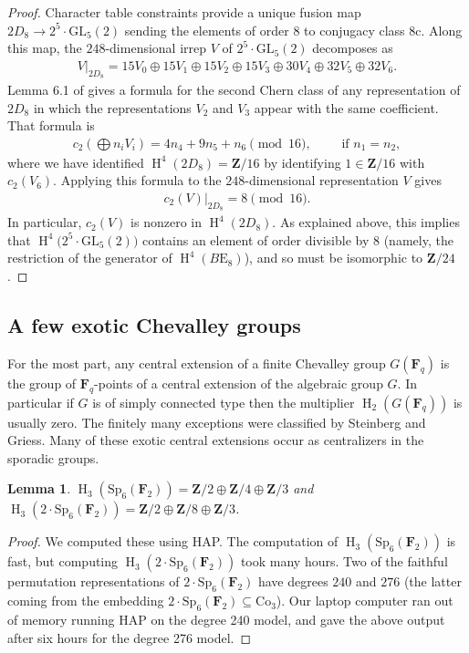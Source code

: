 \documentclass[pdftex]{sigma}
\numberwithin{equation}{section}
\newtheorem{Lemma}[Theorem]{Lemma}
\newcommand\bF{\mathbf F}
\newcommand\bZ{\mathbf Z}
\newcommand\rc{\mathrm c}
\newcommand\rE{\mathrm E}
\DeclareMathOperator\homology{H}
\renewcommand\H{\homology}
\newcommand\<\langle
\renewcommand\>\rangle
\newcommand\Co{\mathrm{Co}}
\newcommand{\GL}{\mathrm{GL}}
\newcommand{\Sp}{\mathrm{Sp}}
\begin{document}
\begin{proof}
Character table constraints provide a unique fusion map $2D_8 \to 2^5\cdot \GL_5(2)$ sending the elements of order $8$ to conjugacy class $8\rc$. Along this map, the $248$-dimensional irrep $V$ of $2^5\cdot \GL_5(2)$ decomposes as
\begin{gather*} V|_{2D_8} = 15 V_0 \oplus 15 V_1 \oplus 15 V_2 \oplus 15 V_3 \oplus 30 V_4 \oplus 32 V_5 \oplus 32 V_6. \end{gather*}
Lemma 6.1 of \cite{jft} gives a formula for the second Chern class of any representation of $2D_8$ in which the representations
$V_2$ and $V_3$
 appear with the same coefficient. That formula is
\begin{gather*} c_2\left(\bigoplus n_i V_i\right) = 4n_4 + 9n_5 + n_6 \pmod {16}, \qquad \text{ if } n_1 = n_2,\end{gather*}
where we have identified $\H^4(2D_8) = \bZ/16$ by identifying $1 \in \bZ/16$ with $c_2(V_6)$. Applying this formula to the $248$-dimensional representation $V$ gives
\begin{gather*} c_2(V)|_{2D_8} = 8 \pmod {16}.\end{gather*}
In particular, $c_2(V)$ is nonzero in $\H^4(2D_8)$. As explained above, this implies that $\H^4\big(2^5\cdot \GL_5(2)\big)$ contains an element of order divisible by $8$ (namely, the restriction of the generator of $\H^4(B\rE_8)$), and so must be isomorphic to $\bZ/24$.
\end{proof}

\subsection{A few exotic Chevalley groups}

For the most part, any central extension of a finite Chevalley group $G(\bF_q)$ is the group of $\bF_q$-points of a central extension of the algebraic group $G$.
 In particular if $G$ is of simply connected type then the multiplier $\H_2(G(\bF_q))$ is usually zero. The finitely many exceptions were classified by Steinberg and Griess. Many of these exotic central extensions occur as centralizers in the sporadic groups.

 \begin{Lemma} \label{lemma:Sp6}$\H_3(\Sp_6(\bF_2)) = \bZ/2 \oplus \bZ/4 \oplus \bZ/3$ and $\H_3(2 \cdot \Sp_6(\bF_2)) = \bZ/2 \oplus \bZ/8 \oplus \bZ/3$.
\end{Lemma}

\begin{proof}We computed these using HAP. The computation of $\H_3(\Sp_6(\bF_2))$ is fast, but computing $\H_3(2 \cdot \Sp_6(\bF_2))$ took many hours. Two of the faithful permutation representations of $2 \cdot \Sp_6(\bF_2)$ have degrees $240$ and $276$ (the latter coming from the embedding $2 \cdot \Sp_6(\bF_2) \subseteq \Co_3$). Our laptop computer ran out of memory running HAP on the degree 240 model, and gave the above output after six hours for the degree 276 model.
\end{proof}
\end{document}
